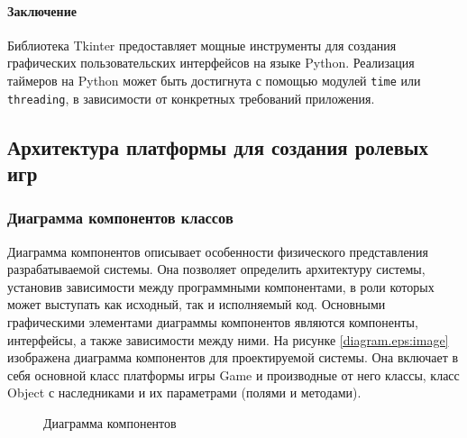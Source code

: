 \paragraph{Заключение}
Библиотека Tkinter предоставляет мощные инструменты для создания графических пользовательских интерфейсов на языке Python. Реализация таймеров на Python может быть достигнута с помощью модулей \texttt{time} или \texttt{threading}, в зависимости от конкретных требований приложения.


\subsection{Архитектура платформы для создания ролевых игр}
\subsubsection{Диаграмма компонентов классов}
Диаграмма компонентов описывает особенности физического представления разрабатываемой системы. Она позволяет определить архитектуру системы, установив зависимости между программными компонентами, в роли которых может выступать как исходный, так и исполняемый код. Основными графическими элементами диаграммы компонентов являются компоненты, интерфейсы, а также зависимости между ними. На рисунке \ref{diagram.eps:image} изображена диаграмма компонентов для проектируемой системы. Она включает в себя основной класс платформы игры Game и производные от него классы, класс Object с наследниками и их параметрами (полями и методами).
\begin{figure}[ht]
	\caption{Диаграмма компонентов}
	\label{diagram:image}
\end{figure}
